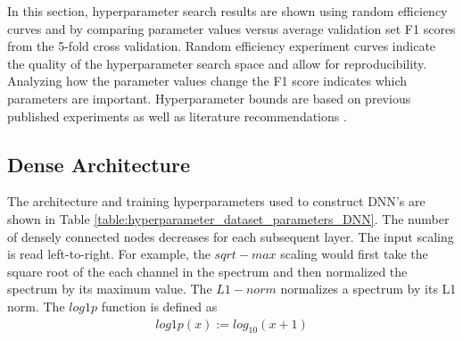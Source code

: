 In this section, hyperparameter search results are shown using random efficiency curves and by comparing parameter values versus average validation set F1 scores from the 5-fold cross validation. Random efficiency experiment curves indicate the quality of the hyperparameter search space and allow for reproducibility. Analyzing how the parameter values change the F1 score indicates which parameters are important. Hyperparameter bounds are based on previous published experiments as well as literature recommendations \cite{kamuda2017, kamuda2018, Bengio2018}.





\subsection{Dense Architecture}

The architecture and training hyperparameters used to construct DNN's are shown in Table \ref{table:hyperparameter_dataset_parameters_DNN}. The number of densely connected nodes decreases for each subsequent layer. The input scaling is read left-to-right. For example, the $sqrt-max$ scaling would first take the square root of the each channel in the spectrum and then normalized the spectrum by its maximum value. The $L1-norm$ normalizes a spectrum by its L1 norm. The $log1p$ function is defined as 
\begin{align} \label{eq:single_layer_eq_sum}
log1p(x) := log_{10}(x+1)
\end{align}

